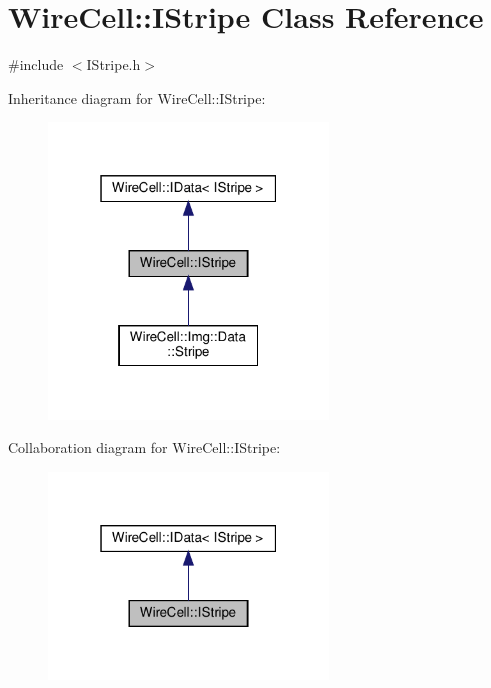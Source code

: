 \hypertarget{class_wire_cell_1_1_i_stripe}{}\section{Wire\+Cell\+:\+:I\+Stripe Class Reference}
\label{class_wire_cell_1_1_i_stripe}


{\ttfamily \#include $<$I\+Stripe.\+h$>$}



Inheritance diagram for Wire\+Cell\+:\+:I\+Stripe\+:
\nopagebreak
\begin{figure}[H]
\begin{center}
\leavevmode
\includegraphics[width=211pt]{class_wire_cell_1_1_i_stripe__inherit__graph}
\end{center}
\end{figure}


Collaboration diagram for Wire\+Cell\+:\+:I\+Stripe\+:
\nopagebreak
\begin{figure}[H]
\begin{center}
\leavevmode
\includegraphics[width=211pt]{class_wire_cell_1_1_i_stripe__coll__graph}
\end{center}
\end{figure}
